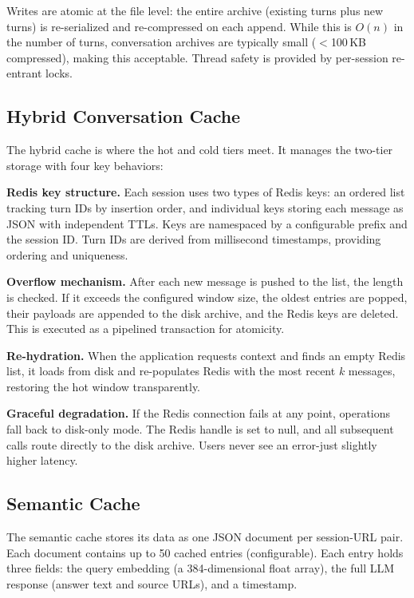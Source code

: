 \documentclass[conference]{IEEEtran}
\begin{document}
Writes are atomic at the file level: the entire archive (existing turns plus new turns) is re-serialized and re-compressed on each append. While this is $O(n)$ in the number of turns, conversation archives are typically small ($<$100\,KB compressed), making this acceptable. Thread safety is provided by per-session re-entrant locks.

\subsection{Hybrid Conversation Cache}

The hybrid cache is where the hot and cold tiers meet. It manages the two-tier storage with four key behaviors:

\textbf{Redis key structure.} Each session uses two types of Redis keys: an ordered list tracking turn IDs by insertion order, and individual keys storing each message as JSON with independent TTLs. Keys are namespaced by a configurable prefix and the session ID. Turn IDs are derived from millisecond timestamps, providing ordering and uniqueness.

\textbf{Overflow mechanism.} After each new message is pushed to the list, the length is checked. If it exceeds the configured window size, the oldest entries are popped, their payloads are appended to the disk archive, and the Redis keys are deleted. This is executed as a pipelined transaction for atomicity.

\textbf{Re-hydration.} When the application requests context and finds an empty Redis list, it loads from disk and re-populates Redis with the most recent $k$ messages, restoring the hot window transparently.

\textbf{Graceful degradation.} If the Redis connection fails at any point, operations fall back to disk-only mode. The Redis handle is set to null, and all subsequent calls route directly to the disk archive. Users never see an error-just slightly higher latency.

\subsection{Semantic Cache}

The semantic cache stores its data as one JSON document per session-URL pair. Each document contains up to 50 cached entries (configurable). Each entry holds three fields: the query embedding (a 384-dimensional float array), the full LLM response (answer text and source URLs), and a timestamp.
\end{document}
